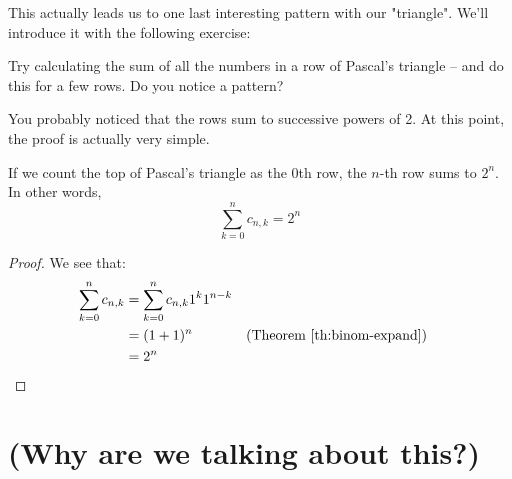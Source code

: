 
This actually leads us to one last interesting pattern with our "triangle". We'll introduce it with the following exercise:

\begin{exercise}
Try calculating the sum of all the numbers in a row of Pascal's triangle -- and do this for a few rows. Do you notice a pattern?
\end{exercise}

\newpage

You probably noticed that the rows sum to successive powers of 2. At this point, the proof is actually very simple.

\begin{theorem} 
\label{th:sum-row-pascal}
If we count the top of Pascal's triangle as the 0th row, the $n$-th row sums to $2^n$. In other words, 
\begin{equation}
\sum_{k=0}^n c_{n,k} = 2^n
\end{equation} 
\end{theorem}

\begin{proof}
We see that:
\begin{align*}
\sum_{k=0}^n c_{n,k} &= \sum_{k=0}^n c_{n,k} 1^k 1^{n-k} \\
&= (1+1)^n && \text{(Theorem \ref{th:binom-expand})} \\
&= 2^n
\end{align*}
\end{proof}





\section{(Why are we talking about this?)}




